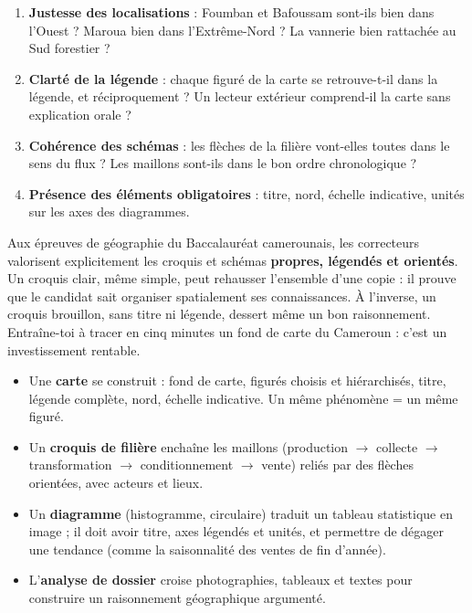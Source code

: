 \documentclass[11pt]{article}
\begin{document}
\begin{methode}
\begin{enumerate}
\item \textbf{Justesse des localisations} : Foumban et Bafoussam sont-ils bien dans l'Ouest ? Maroua bien dans l'Extrême-Nord ? La vannerie bien rattachée au Sud forestier ?
\item \textbf{Clarté de la légende} : chaque figuré de la carte se retrouve-t-il dans la légende, et réciproquement ? Un lecteur extérieur comprend-il la carte sans explication orale ?
\item \textbf{Cohérence des schémas} : les flèches de la filière vont-elles toutes dans le sens du flux ? Les maillons sont-ils dans le bon ordre chronologique ?
\item \textbf{Présence des éléments obligatoires} : titre, nord, échelle indicative, unités sur les axes des diagrammes.
\end{enumerate}
\end{methode}

\begin{savaistu}
Aux épreuves de géographie du Baccalauréat camerounais, les correcteurs valorisent explicitement les croquis et schémas \textbf{propres, légendés et orientés}. Un croquis clair, même simple, peut rehausser l'ensemble d'une copie : il prouve que le candidat sait organiser spatialement ses connaissances. À l'inverse, un croquis brouillon, sans titre ni légende, dessert même un bon raisonnement. Entraîne-toi à tracer en cinq minutes un fond de carte du Cameroun : c'est un investissement rentable.
\end{savaistu}

\begin{aretenir}
\begin{itemize}
\item Une \textbf{carte} se construit : fond de carte, figurés choisis et hiérarchisés, titre, légende complète, nord, échelle indicative. Un même phénomène = un même figuré.
\item Un \textbf{croquis de filière} enchaîne les maillons (production $\rightarrow$ collecte $\rightarrow$ transformation $\rightarrow$ conditionnement $\rightarrow$ vente) reliés par des flèches orientées, avec acteurs et lieux.
\item Un \textbf{diagramme} (histogramme, circulaire) traduit un tableau statistique en image ; il doit avoir titre, axes légendés et unités, et permettre de dégager une tendance (comme la saisonnalité des ventes de fin d'année).
\item L'\textbf{analyse de dossier} croise photographies, tableaux et textes pour construire un raisonnement géographique argumenté.
\end{itemize}
\end{aretenir}
\end{document}
